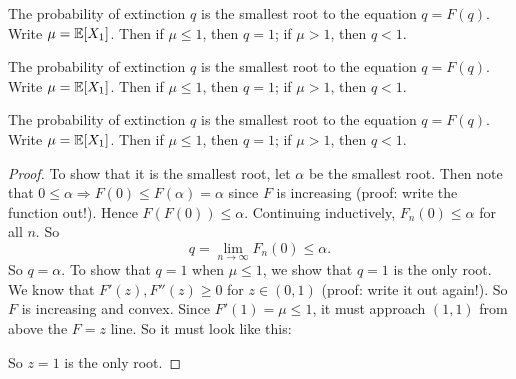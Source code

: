 \begin{note}
  \begin{field}
    \begin{thm}
      The probability of extinction $q$ is the smallest root to the equation $q = F(q)$. Write $\mu = \mathbb{E}[X_1]$. Then if $\mu \leq 1$, then $q = 1$; if $\mu > 1$, then $q < 1$.
    \end{thm}
  \end{field}
  \begin{field}
    \begin{thm}
      The probability of extinction $q$ is the smallest root to the equation $q = F(q)$. Write $\mu = \mathbb{E}[X_1]$. Then if $\mu \leq 1$, then $q = 1$; if $\mu > 1$, then $q < 1$.
    \end{thm}
  \end{field}
  \xplain{}%
\end{note}

%
\begin{note}
  \begin{field}
    \begin{thm}
      The probability of extinction $q$ is the smallest root to the equation $q = F(q)$. Write $\mu = \mathbb{E}[X_1]$. Then if $\mu \leq 1$, then $q = 1$; if $\mu > 1$, then $q < 1$.
    \end{thm}
  \end{field}
  \begin{field}
    \begin{proof}
      To show that it is the smallest root, let $\alpha$ be the smallest root. Then note that $0 \leq \alpha \Rightarrow F(0) \leq F(\alpha) = \alpha$ since $F$ is increasing (proof: write the function out!). Hence $F(F(0)) \leq \alpha$. Continuing inductively, $F_n(0) \leq \alpha$ for all $n$. So
      \[
        q = \lim_{n \to \infty}F_n(0) \leq \alpha.
      \]
      So $q = \alpha$.
      To show that $q = 1$ when $\mu \leq 1$, we show that $q = 1$ is the only root. We know that $F'(z), F''(z) \geq 0$ for $z\in (0, 1)$ (proof: write it out again!). So $F$ is increasing and convex. Since $F'(1) = \mu \leq 1$, it must approach $(1, 1)$ from above the $F = z$ line. So it must look like this:
      \begin{center}
      \end{center}
      So $z = 1$ is the only root.
    \end{proof}
  \end{field}
  \xplain{}%
\end{note}

